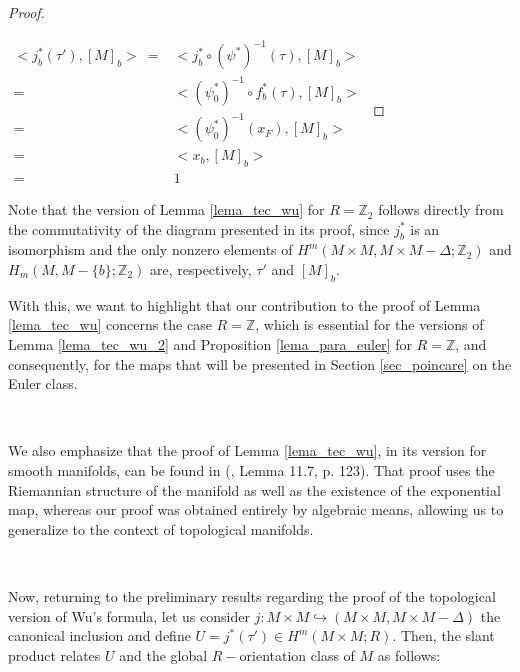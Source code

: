 \documentclass[12pt,oneside]{book}
\newcommand{\Z}{\mathbb{Z}}
\begin{document}
\begin{proof}
        \
        
        $\begin{array}{rl}
            <j_{b}^{*}(\tau'),[M]_{b}> \ = & <j_{b}^{*}\circ (\psi^{*})^{-1}(\tau),[M]_{b}> \\
            = & <(\psi_{0}^{*})^{-1}\circ f_{b}^{*}(\tau),[M]_{b}> \\
            = & <(\psi_{0}^{*})^{-1}(x_{F}),[M]_{b}> \\
            = & <x_{b},[M]_{b}> \\
            = & 1
        \end{array}$

    \end{proof}

    Note that the version of Lemma \ref{lema_tec_wu} for $R=\Z_{2}$ follows directly from the commutativity of the diagram presented in its 
    proof, since $j_{b}^{*}$ is an isomorphism and the only nonzero elements of $H^{m}(M\times M,M\times M-\Delta;\Z_{2})$ and 
    $H_{m}(M,M-\{b\};\Z_{2})$ are, respectively, $\tau'$ and $[M]_{b}$.

    With this, we want to highlight that our contribution to the proof of Lemma \ref{lema_tec_wu} concerns the case $R=\Z$, which is essential 
    for the versions of Lemma \ref{lema_tec_wu_2} and Proposition \ref{lema_para_euler} for $R=\Z$, and consequently, for the maps that will 
    be presented in Section \ref{sec_poincare} on the Euler class.

    \

    We also emphasize that the proof of Lemma \ref{lema_tec_wu}, in its version for smooth manifolds, can be found in 
    (\cite{milnor_1}, Lemma 11.7, p. 123). That proof uses the Riemannian structure of the manifold as well as the 
    existence of the exponential map, whereas our proof was obtained entirely by algebraic means, allowing us to 
    generalize to the context of topological manifolds.

    \

    Now, returning to the preliminary results regarding the proof of the topological version of Wu's formula, let us 
    consider $j:M\times M\hookrightarrow (M\times M,M\times M-\Delta)$ the canonical inclusion and define 
    $U=j^{*}(\tau')\in H^{m}(M\times M;R)$. Then, the slant product relates $U$ and the global $R-$orientation 
    class of $M$ as follows:
\end{document}
